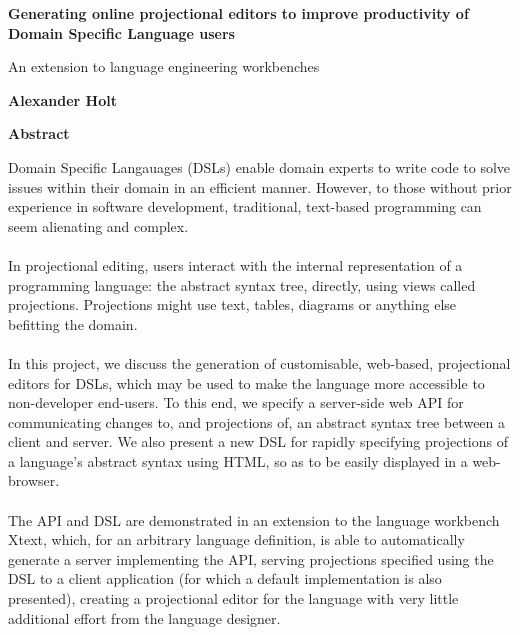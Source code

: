 \documentclass{article}
\begin{document}
\clearpage
%
\thispagestyle{plain}
\begin{center}
    \Large
    \textbf{Generating online projectional editors to improve productivity of Domain Specific Language users}
    
    \vspace{0.4cm}
    \large
    An extension to language engineering workbenches
    
    \vspace{0.4cm}
    \textbf{Alexander Holt}
    
    \vspace{0.9cm}
    \textbf{Abstract}
\end{center}
Domain Specific Langauages (DSLs) enable domain experts to write code to solve issues within their domain in an efficient manner. However, to those without prior experience in software development, traditional, text-based programming can seem alienating and complex.
\\
\\
In projectional editing, users interact with the internal representation of a programming language: the abstract syntax tree, directly, using views called projections. Projections might use text, tables, diagrams or anything else befitting the domain.
\\
\\
In this project, we discuss the generation of customisable, web-based, projectional editors for DSLs, which may be used to make the language more accessible to non-developer end-users. To this end, we specify a server-side web API for communicating changes to, and projections of, an abstract syntax tree between a client and server. We also present a new DSL for rapidly specifying projections of a language's abstract syntax using HTML, so as to be easily displayed in a web-browser. 
\\
\\
The API and DSL are demonstrated in an extension to the language workbench Xtext, which, for an arbitrary language definition, is able to automatically generate a server implementing the API, serving projections specified using the DSL to a client application (for which a default implementation is also presented), creating a projectional editor for the language with very little additional effort from the language designer. 
\end{document}
